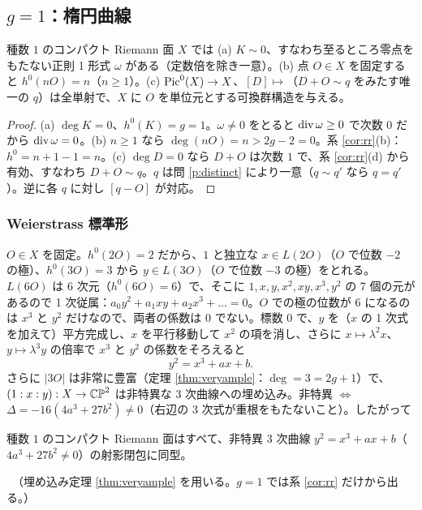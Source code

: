 \subsection{$g=1$：楕円曲線}
\begin{prop}\label{prop:g1}
種数 $1$ のコンパクト Riemann 面 $X$ では (a) $K\sim0$、すなわち至るところ零点をもたない正則 1 形式 $\omega$ がある（定数倍を除き一意）。(b) 点 $O\in X$ を固定すると $h^0(nO)=n$（$n\ge1$）。(c) $\mathrm{Pic}^0(X)\to X$、$[D]\mapsto$（$D+O\sim q$ をみたす唯一の $q$）は全単射で、$X$ に $O$ を単位元とする可換群構造を与える。
\end{prop}
\begin{proof}
(a) $\deg K=0$、$h^0(K)=g=1$。$\omega\ne0$ をとると $\operatorname{div}\omega\ge0$ で次数 $0$ だから $\operatorname{div}\omega=0$。(b) $n\ge1$ なら $\deg(nO)=n>2g-2=0$。系 \ref{cor:rr}(b)：$h^0=n+1-1=n$。(c) $\deg D=0$ なら $D+O$ は次数 $1$ で、系 \ref{cor:rr}(d) から有効、すなわち $D+O\sim q$。$q$ は問 \ref{p:distinct} により一意（$q\sim q'$ なら $q=q'$）。逆に各 $q$ に対し $[q-O]$ が対応。
\end{proof}

\subsubsection*{Weierstrass 標準形}
$O\in X$ を固定。$h^0(2O)=2$ だから、$1$ と独立な $x\in L(2O)$（$O$ で位数 $-2$ の極）、$h^0(3O)=3$ から $y\in L(3O)$（$O$ で位数 $-3$ の極）をとれる。$L(6O)$ は 6 次元（$h^0(6O)=6$）で、そこに $1,x,y,x^2,xy,x^3,y^2$ の 7 個の元があるので 1 次従属：$a_0y^2+a_1xy+a_2x^3+\dots=0$。$O$ での極の位数が $6$ になるのは $x^3$ と $y^2$ だけなので、両者の係数は $0$ でない。標数 $0$ で、$y$ を（$x$ の 1 次式を加えて）平方完成し、$x$ を平行移動して $x^2$ の項を消し、さらに $x\mapsto\lambda^2x$、$y\mapsto\lambda^3y$ の倍率で $x^3$ と $y^2$ の係数をそろえると
\begin{equation}\label{eq:weierstrass}
y^2=x^3+ax+b .
\end{equation}
さらに $|3O|$ は非常に豊富（定理 \ref{thm:veryample}：$\deg=3=2g+1$）で、$(1:x:y):X\to\mathbb{CP}^2$ は非特異な 3 次曲線への埋め込み。非特異 $\iff$ $\Delta=-16(4a^3+27b^2)\ne0$（右辺の 3 次式が重根をもたないこと）。したがって
\begin{thm}\label{thm:weier}
種数 $1$ のコンパクト Riemann 面はすべて、非特異 3 次曲線 $y^2=x^3+ax+b$（$4a^3+27b^2\ne0$）の射影閉包に同型。
\end{thm}
\tP\ （埋め込み定理 \ref{thm:veryample} を用いる。$g=1$ では系 \ref{cor:rr} だけから出る。）

